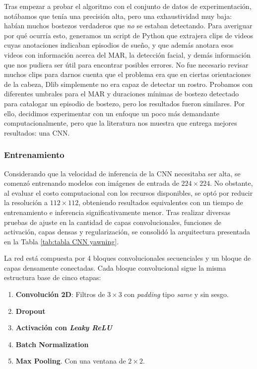Tras empezar a probar el algoritmo con el conjunto de datos de experimentación, notábamos que tenía una precisión alta, pero una exhaustividad muy baja: habían muchos bostezos verdaderos que \textit{no} se estaban detectando. Para averiguar por qué ocurría esto, generamos un script de Python que extrajera clips de videos cuyas anotaciones indicaban episodios de sueño, y que además anotara esos videos con información acerca del MAR, la detección facial, y demás información que nos pudiera ser útil para encontrar posibles errores. No fue necesario revisar muchos clips para darnos cuenta que el problema era que en ciertas orientaciones de la cabeza, Dlib simplemente no era capaz de detectar un rostro. Probamos con diferentes umbrales para el MAR y duraciones mínimas de bostezo detectado para catalogar un episodio de bostezo, pero los resultados fueron similares. Por ello, decidimos experimentar con un enfoque un poco más demandante computacionalmente, pero que la literatura nos muestra que entrega mejores resultados: una CNN. 

\subsubsection{Entrenamiento}

Considerando que la velocidad de inferencia de la CNN necesitaba ser alta, se comenzó entrenando modelos con imágenes de entrada de $224\times224$. No obstante, al evaluar el costo computacional con los recursos disponibles, se optó por reducir la resolución a $112\times112$, obteniendo resultados equivalentes con un tiempo de entrenamiento e inferencia significativamente menor. Tras realizar diversas pruebas de ajuste en la cantidad de capas convolucionales, funciones de activación, capas densas y regularización, se consolidó la arquitectura presentada en la Tabla \ref{tab:tabla CNN yawning}.

La red está compuesta por 4 bloques convolucionales secuenciales y un bloque de capas densamente conectadas. Cada bloque convolucional sigue la misma estructura base de cinco etapas:
\begin{enumerate}[noitemsep,topsep=0pt]
    \item \textbf{Convolución 2D}: Filtros de $3\times3$ con \textit{padding} tipo \textit{same} y sin sesgo.
    \item \textbf{Dropout}
    \item \textbf{Activación con \textit{Leaky ReLU}}
    \item \textbf{Batch Normalization}
    \item \textbf{Max Pooling}. Con una ventana de $2\times2$.
\end{enumerate}

